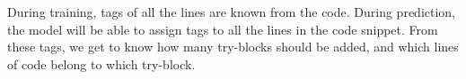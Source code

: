 






During training, tags of all the lines are known from the code. During prediction, the model will be able to assign tags to all the lines in the code snippet. From these tags, we get to know how many try-blocks should be added, and which lines of code belong to which try-block.






